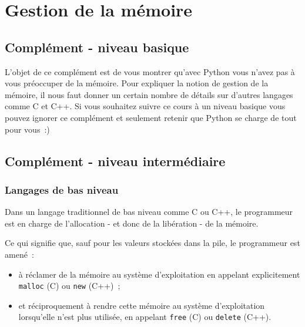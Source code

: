     
    
    
    

    

    \hypertarget{gestion-de-la-muxe9moire}{%
\section{Gestion de la mémoire}\label{gestion-de-la-muxe9moire}}

    \hypertarget{compluxe9ment---niveau-basique}{%
\subsection{Complément - niveau
basique}\label{compluxe9ment---niveau-basique}}

    L'objet de ce complément est de vous montrer qu'avec Python vous n'avez
pas à vous préoccuper de la mémoire. Pour expliquer la notion de gestion
de la mémoire, il nous faut donner un certain nombre de détails sur
d'autres langages comme C et C++. Si vous souhaitez suivre ce cours à un
niveau basique vous pouvez ignorer ce complément et seulement retenir
que Python se charge de tout pour vous~:)

    \hypertarget{compluxe9ment---niveau-intermuxe9diaire}{%
\subsection{Complément - niveau
intermédiaire}\label{compluxe9ment---niveau-intermuxe9diaire}}

    \hypertarget{langages-de-bas-niveau}{%
\subsubsection{Langages de bas niveau}\label{langages-de-bas-niveau}}

    Dans un langage traditionnel de bas niveau comme C ou C++, le
programmeur est en charge de l'allocation - et donc de la libération -
de la mémoire.

Ce qui signifie que, sauf pour les valeurs stockées dans la pile, le
programmeur est amené~:

\begin{itemize}
\tightlist
\item
  à réclamer de la mémoire au système d'exploitation en appelant
  explicitement \texttt{malloc} (C) ou \texttt{new} (C++)~;
\item
  et réciproquement à rendre cette mémoire au système d'exploitation
  lorsqu'elle n'est plus utilisée, en appelant \texttt{free} (C) ou
  \texttt{delete} (C++).
\end{itemize}

